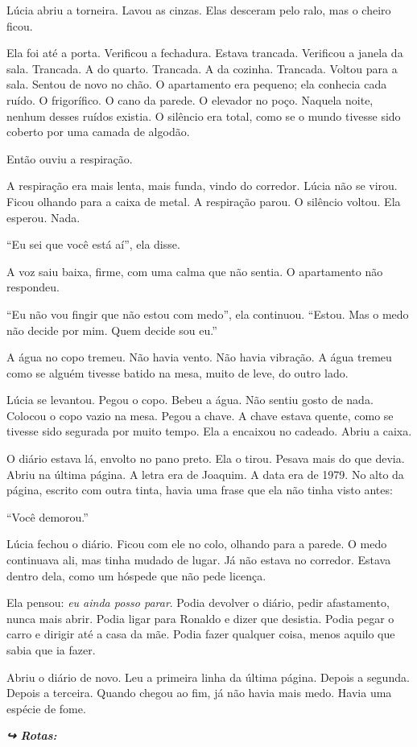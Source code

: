 \noindent Lúcia abriu a torneira. Lavou as cinzas. Elas desceram pelo ralo, mas o cheiro ficou.

\noindent Ela foi até a porta. Verificou a fechadura. Estava trancada. Verificou a janela da sala. Trancada. A do quarto. Trancada. A da cozinha. Trancada. Voltou para a sala. Sentou de novo no chão. O apartamento era pequeno; ela conhecia cada ruído. O frigorífico. O cano da parede. O elevador no poço. Naquela noite, nenhum desses ruídos existia. O silêncio era total, como se o mundo tivesse sido coberto por uma camada de algodão.

\noindent Então ouviu a respiração.

\noindent A respiração era mais lenta, mais funda, vindo do corredor. Lúcia não se virou. Ficou olhando para a caixa de metal. A respiração parou. O silêncio voltou. Ela esperou. Nada.

\noindent ``Eu sei que você está aí'', ela disse.

\noindent A voz saiu baixa, firme, com uma calma que não sentia. O apartamento não respondeu.

\noindent ``Eu não vou fingir que não estou com medo'', ela continuou. ``Estou. Mas o medo não decide por mim. Quem decide sou eu.''

\noindent A água no copo tremeu. Não havia vento. Não havia vibração. A água tremeu como se alguém tivesse batido na mesa, muito de leve, do outro lado.

\noindent Lúcia se levantou. Pegou o copo. Bebeu a água. Não sentiu gosto de nada. Colocou o copo vazio na mesa. Pegou a chave. A chave estava quente, como se tivesse sido segurada por muito tempo. Ela a encaixou no cadeado. Abriu a caixa.

\noindent O diário estava lá, envolto no pano preto. Ela o tirou. Pesava mais do que devia. Abriu na última página. A letra era de Joaquim. A data era de 1979. No alto da página, escrito com outra tinta, havia uma frase que ela não tinha visto antes:

\noindent ``Você demorou.''

\noindent Lúcia fechou o diário. Ficou com ele no colo, olhando para a parede. O medo continuava ali, mas tinha mudado de lugar. Já não estava no corredor. Estava dentro dela, como um hóspede que não pede licença.

\noindent Ela pensou: \textit{eu ainda posso parar}. Podia devolver o diário, pedir afastamento, nunca mais abrir. Podia ligar para Ronaldo e dizer que desistia. Podia pegar o carro e dirigir até a casa da mãe. Podia fazer qualquer coisa, menos aquilo que sabia que ia fazer.

\noindent Abriu o diário de novo. Leu a primeira linha da última página. Depois a segunda. Depois a terceira. Quando chegou ao fim, já não havia mais medo. Havia uma espécie de fome.

\noindent\textit{\textbf{↪ Rotas:}  \rotasep {} \rotasep {}}
